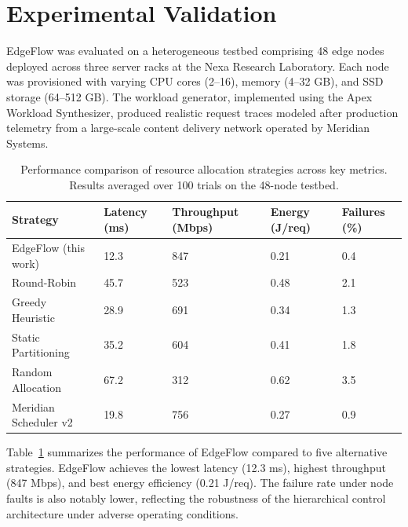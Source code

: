 \section{Experimental Validation}

EdgeFlow was evaluated on a heterogeneous testbed comprising 48 edge nodes deployed across three server racks at the Nexa Research Laboratory. Each node was provisioned with varying CPU cores (2--16), memory (4--32 GB), and SSD storage (64--512 GB). The workload generator, implemented using the Apex Workload Synthesizer, produced realistic request traces modeled after production telemetry from a large-scale content delivery network operated by Meridian Systems.

\begin{table}[htbp]
\centering
\caption{Performance comparison of resource allocation strategies across key metrics. Results averaged over 100 trials on the 48-node testbed.}
\label{tab:results}
\begin{tabularx}{\textwidth}{lXXXX}
\toprule
Strategy & Latency (ms) & Throughput (Mbps) & Energy (J/req) & Failures (\%) \\
\midrule
EdgeFlow (this work)   & 12.3 & 847 & 0.21 & 0.4 \\
Round-Robin             & 45.7 & 523 & 0.48 & 2.1 \\
Greedy Heuristic        & 28.9 & 691 & 0.34 & 1.3 \\
Static Partitioning     & 35.2 & 604 & 0.41 & 1.8 \\
Random Allocation       & 67.2 & 312 & 0.62 & 3.5 \\
Meridian Scheduler v2   & 19.8 & 756 & 0.27 & 0.9 \\
\bottomrule
\end{tabularx}
\end{table}

Table~\ref{tab:results} summarizes the performance of EdgeFlow compared to five alternative strategies. EdgeFlow achieves the lowest latency (12.3 ms), highest throughput (847 Mbps), and best energy efficiency (0.21 J/req). The failure rate under node faults is also notably lower, reflecting the robustness of the hierarchical control architecture under adverse operating conditions.

